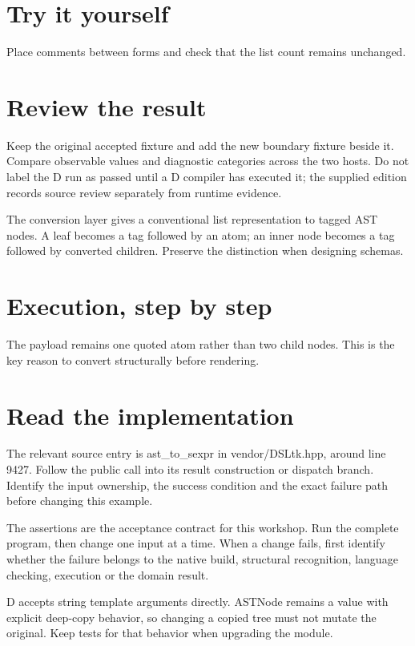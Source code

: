 \section*{Try it yourself}
Place comments between forms and check that the list count remains unchanged.

\section*{Review the result}
Keep the original accepted fixture and add the new boundary fixture beside it. Compare observable values and diagnostic categories across the two hosts. Do not label the D run as passed until a D compiler has executed it; the supplied edition records source review separately from runtime evidence.

\clearpage
{}
The conversion layer gives a conventional list representation to tagged AST nodes. A leaf becomes a tag followed by an atom; an inner node becomes a tag followed by converted children. Preserve the distinction when designing schemas.


\section*{Execution, step by step}
The payload remains one quoted atom rather than two child nodes. This is the key reason to convert structurally before rendering.

\section*{Read the implementation}
The relevant source entry is ast\_to\_sexpr in vendor/DSLtk.hpp, around line 9427. Follow the public call into its result construction or dispatch branch. Identify the input ownership, the success condition and the exact failure path before changing this example.

The assertions are the acceptance contract for this workshop. Run the complete program, then change one input at a time. When a change fails, first identify whether the failure belongs to the native build, structural recognition, language checking, execution or the domain result.

\clearpage
{}
D accepts string template arguments directly. ASTNode remains a value with explicit deep-copy behavior, so changing a copied tree must not mutate the original. Keep tests for that behavior when upgrading the module.

